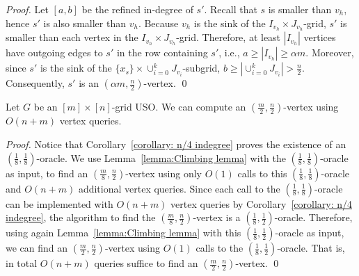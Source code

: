 \documentclass[runningheads,a4paper]{llncs}
\newcommand{\indegree}{refined in-degree\xspace}
\begin{document}
\begin{proof}
Let $[a,b]$ be the \indegree of $s'$.
Recall that $s$ is smaller than $v_h$, hence $s'$ is also smaller than $v_h$.
Because $v_h$ is the sink of the $I_{v_h}\times J_{v_h}$-grid, $s'$ is smaller than each vertex in the $I_{v_h}\times J_{v_h}$-grid.
Therefore, at least $|I_{v_h}|$ vertices have outgoing edges to $s'$ in the row containing $s'$, i.e., $a\geq |I_{v_h}| \geq \alpha m$.
Moreover, since $s'$ is the sink of the $\{x_s\}\times \cup_{i=0}^k J_{v_i}$-subgrid, $b \geq |\cup_{i=0}^k J_{v_i}|  >  \frac{n}{2}$.
Consequently, $s'$ is an $(\alpha m,  \frac{n}{2})$-vertex. \qed
\end{proof}

\begin{corollary}\label{corollary: (m/2,n/2) indegree}
Let $G$ be an $[m]\times [n]$-grid USO. 
We can compute an $( \frac{m}{2}, \frac{n}{2})$-vertex using $O(n + m)$ vertex queries.
\end{corollary}
\begin{proof}
Notice that Corollary~\ref{corollary: n/4 indegree} proves the existence of an $( \frac{1}{8}, \frac{1}{8})$-oracle.
We use Lemma~\ref{lemma:Climbing lemma} with the $(\frac{1}{8}, \frac{1}{8})$-oracle as input, to find an $(\frac{m}{8}, \frac{n}{2})$-vertex using only $O(1)$ calls to this $(\frac{1}{8}, \frac{1}{8})$-oracle and $O(n+m)$ additional vertex queries. Since each call to the  $(\frac{1}{8}, \frac{1}{8})$-oracle can be implemented with $O(n+m)$ vertex queries by Corollary~\ref{corollary: n/4 indegree}, the algorithm to find the $(\frac{m}{8}, \frac{n}{2})$-vertex is a $(\frac{1}{8}, \frac{1}{2})$-oracle. 
Therefore, using again Lemma~\ref{lemma:Climbing lemma} with this $(\frac{1}{8}, \frac{1}{2})$-oracle as input, we can find an $(\frac{m}{2}, \frac{n}{2})$-vertex using $O(1)$ calls to the $(\frac{1}{8}, \frac{1}{2})$-oracle. That is, in total $O(n + m)$ queries suffice to find an $(\frac{m}{2}, \frac{n}{2})$-vertex. \qed
\end{proof}
\end{document}
